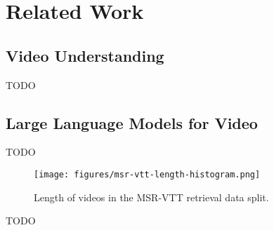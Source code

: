 \section{Related Work}

\subsection{Video Understanding}

TODO

\subsection{Large Language Models for Video}

TODO

\begin{figure}[h]
      \centering
      \texttt{[image: figures/msr-vtt-length-histogram.png]}
      \caption{Length of videos in the MSR-VTT retrieval data split.}
      \label{fig:length_histogram}
\end{figure}

TODO
